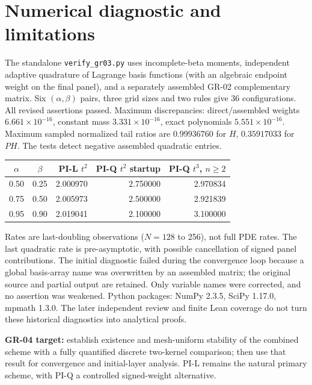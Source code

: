 \documentclass[11pt,a4paper]{article}
\begin{document}
\section{Numerical diagnostic and limitations}
The standalone \texttt{verify\_gr03.py} uses incomplete-beta moments, independent adaptive quadrature of Lagrange basis functions (with an algebraic endpoint weight on the final panel), and a separately assembled GR-02 complementary matrix. Six $(\alpha,\beta)$ pairs, three grid sizes and two rules give 36 configurations. All revised assertions passed. Maximum discrepancies: direct/assembled weights $6.661\times10^{-16}$, constant mass $3.331\times10^{-16}$, exact polynomials $5.551\times10^{-16}$. Maximum sampled normalized tail ratios are $0.99936760$ for $H$, $0.35917033$ for $PH$. The tests detect negative assembled quadratic entries.
\begin{center}\small
\begin{tabular}{ccrrr}
\toprule
$\alpha$ & $\beta$ & PI-L $t^2$ & PI-Q $t^2$ startup & PI-Q $t^3$, $n\ge2$\\\midrule
0.50&0.25&2.000970&2.750000&2.970834\\
0.75&0.50&2.005973&2.500000&2.921839\\
0.95&0.90&2.019041&2.100000&3.100000\\\bottomrule
\end{tabular}
\end{center}
Rates are last-doubling observations ($N=128$ to 256), not full PDE rates. The last quadratic rate is pre-asymptotic, with possible cancellation of signed panel contributions. The initial diagnostic failed during the convergence loop because a global basis-array name was overwritten by an assembled matrix; the original source and partial output are retained. Only variable names were corrected, and no assertion was weakened. Python packages: NumPy 2.3.5, SciPy 1.17.0, mpmath 1.3.0. The later independent review and finite Lean coverage do not turn these historical diagnostics into analytical proofs.

\textbf{GR-04 target:} establish existence and mesh-uniform stability of the combined scheme with a fully quantified discrete two-kernel comparison; then use that result for convergence and initial-layer analysis. PI-L remains the natural primary scheme, with PI-Q a controlled signed-weight alternative.
\end{document}
